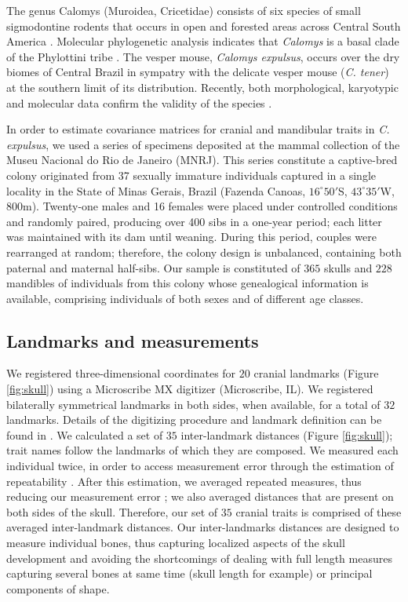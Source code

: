 \documentclass [twocolumn, natbib, nospthms, 10pt] {svjour3}
\begin{document}
The genus Calomys (Muroidea, Cricetidae) consists of six species of
small sigmodontine rodents that occurs in open and forested areas
across Central South America \citep{hershkovitz_evolution_1962,
  bonvicino_karyotype_2000, bonvicino_new_2003}. Molecular
phylogenetic analysis indicates that \emph{Calomys} is a basal clade
of the Phylottini tribe \citep{steppan_phylogeny_2004}. The vesper
mouse, \emph{Calomys expulsus}, occurs over the dry biomes of Central
Brazil in sympatry with the delicate vesper mouse (\emph{C. tener}) at
the southern limit of its distribution. Recently, both morphological,
karyotypic and molecular data confirm the validity of the species
\citep {bonvicino_karyotype_2000, almeida_phylogeny_2007}.

In order to estimate covariance matrices for cranial and mandibular
traits in \emph{C. expulsus}, we used a series of specimens deposited
at the mammal collection of the Museu Nacional do Rio de Janeiro
(MNRJ). This series constitute a captive-bred colony originated from
37 sexually immature individuals captured in a single locality in the
State of Minas Gerais, Brazil (Fazenda Canoas, $16^{\circ} 50'$S,
$43^{\circ} 35'$W, 800m). Twenty-one males and 16 females were placed
under controlled conditions and randomly paired, producing over 400
sibs in a one-year period; each litter was maintained with its dam
until weaning. During this period, couples were rearranged at random;
therefore, the colony design is unbalanced, containing both paternal
and maternal half-sibs. Our sample is constituted of $365$ skulls and
$228$ mandibles of individuals from this colony whose genealogical
information is available, comprising individuals of both sexes and of
different age classes.

\subsection {Landmarks and measurements}
\label {mms:lms}

We registered three-dimensional coordinates for $20$ cranial landmarks
(Figure \ref{fig:skull}) using a Microscribe MX digitizer
(Microscribe, IL). We registered bilaterally symmetrical landmarks in
both sides, when available, for a total of $32$ landmarks. Details of
the digitizing procedure and landmark definition can be found in
\citet{cheverud_morphological_1995}. We calculated a set of $35$
inter-landmark distances (Figure \ref{fig:skull}); trait names follow
the landmarks of which they are composed. We measured each individual
twice, in order to access measurement error through the estimation of
repeatability \citep{lessels_unrepeatable_1987}. After this
estimation, we averaged repeated measures, thus reducing our
measurement error \citep{falconer_introduction_1996}; we also averaged
distances that are present on both sides of the skull. Therefore, our
set of $35$ cranial traits is comprised of these averaged
inter-landmark distances. Our inter-landmarks distances are designed
to measure individual bones, thus capturing localized aspects of the
skull development and avoiding the shortcomings of dealing with full
length measures capturing several bones at same time (skull length for
example) or principal components of shape.
\end{document}
